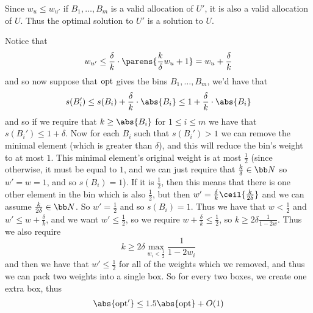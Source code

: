 \benum
    \item Since $w_u\leq w_{u'}$ if $B_1,\dots,B_m$ is a valid allocation of $U'$, it is also a valid allocation of $U$.
    Thus the optimal solution to $U'$ is a solution to $U$.
    \item Notice that
    $$ w_{u'} \leq \frac\delta k\cdot\parens{\frac k\delta w_u+1} = w_u + \frac\delta k $$
    and so now suppose that ${\rm opt}$ gives the bins $B_1,\dots,B_m$, we'd have that
    $$ s(B_i') \leq s(B_i) + \frac\delta k\cdot\abs{B_i} \leq 1 + \frac\delta k\cdot\abs{B_i} $$
    and so if we require that $k\geq\abs{B_i}$ for $1\leq i\leq m$ we have that $s(B_i')\leq 1+\delta$.
    Now for each $B_i$ such that $s(B_i')>1$ we can remove the minimal element (which is greater than $\delta$), and this will reduce the bin's weight to at most $1$.
    This minimal element's original weight is at most $\frac12$ (since otherwise, it must be equal to $1$, and we can just require that $\frac k\delta\in{\bb N}$ so $w'=w=1$, and so $s(B_i)=1$).
    If it is $\frac12$, then this means that there is one other element in the bin which is also $\frac12$, but then $w'=\frac\delta k\ceil{\frac k{2\delta}}$ and we can assume $\frac k{2\delta}\in{\bb N}$.
    So $w'=\frac12$ and so $s(B_i)=1$.
    Thus we have that $w<\frac12$ and $w'\leq w+\frac\delta k$, and we want $w'\leq\frac12$, so we require $w+\frac\delta k\leq\frac12$, so $k\geq2\delta\frac1{1-2w}$.
    Thus we also require
    $$ k \geq 2\delta\max_{w_i<\frac12}\frac1{1-2w_i} $$
    and then we have that $w'\leq\frac12$ for all of the weights which we removed, and thus we can pack two weights into a single box.
    So for every two boxes, we create one extra box, thus
    $$ \abs{\rm opt'} \leq 1.5\abs{\rm opt} + O(1) $$
\eenum

\bye

